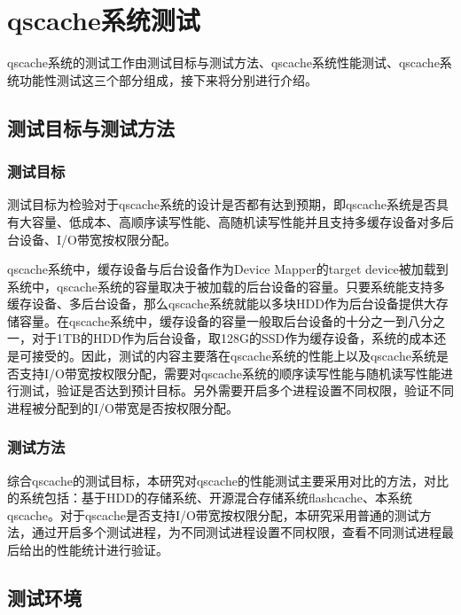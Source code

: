 
\chapter{qscache系统测试}
\label{chap:sys_test}

qscache系统的测试工作由测试目标与测试方法、qscache系统性能测试、qscache系统功能性测试这三个部分组成，接下来将分别进行介绍。

\section{测试目标与测试方法}

\subsection{测试目标}

测试目标为检验对于qscache系统的设计是否都有达到预期，即qscache系统是否具有大容量、低成本、高顺序读写性能、高随机读写性能并且支持多缓存设备对多后台设备、I/O带宽按权限分配。

qscache系统中，缓存设备与后台设备作为Device Mapper的target device被加载到系统中，qscache系统的容量取决于被加载的后台设备的容量。只要系统能支持多缓存设备、多后台设备，那么qscache系统就能以多块HDD作为后台设备提供大存储容量。在qscache系统中，缓存设备的容量一般取后台设备的十分之一到八分之一，对于1TB的HDD作为后台设备，取128G的SSD作为缓存设备，系统的成本还是可接受的。因此，测试的内容主要落在qscache系统的性能上以及qscache系统是否支持I/O带宽按权限分配，需要对qscache系统的顺序读写性能与随机读写性能进行测试，验证是否达到预计目标。另外需要开启多个进程设置不同权限，验证不同进程被分配到的I/O带宽是否按权限分配。

\subsection{测试方法}

综合qscache的测试目标，本研究对qscache的性能测试主要采用对比的方法，对比的系统包括：基于HDD的存储系统、开源混合存储系统flashcache、本系统qscache。对于qscache是否支持I/O带宽按权限分配，本研究采用普通的测试方法，通过开启多个测试进程，为不同测试进程设置不同权限，查看不同测试进程最后给出的性能统计进行验证。

\section{测试环境}

